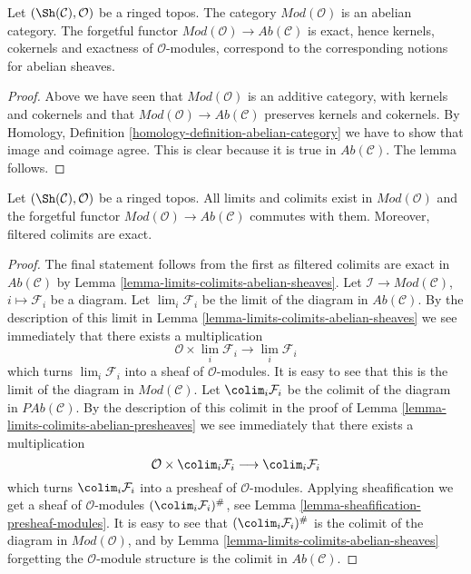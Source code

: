 \begin{lemma}
\label{lemma-abelian}
Let $(\Sh(\mathcal{C}), \mathcal{O})$ be a ringed topos.
The category $\textit{Mod}(\mathcal{O})$ is an abelian category.
The forgetful functor
$\textit{Mod}(\mathcal{O}) \to \textit{Ab}(\mathcal{C})$
is exact, hence kernels, cokernels and exactness of
$\mathcal{O}$-modules, correspond to the corresponding notions
for abelian sheaves.
\end{lemma}

\begin{proof}
Above we have seen that $\textit{Mod}(\mathcal{O})$ is an additive
category, with kernels and cokernels
and that $\textit{Mod}(\mathcal{O}) \to \textit{Ab}(\mathcal{C})$
preserves kernels and cokernels.
By Homology, Definition \ref{homology-definition-abelian-category}
we have to show that image and coimage agree. This is clear
because it is true in $\textit{Ab}(\mathcal{C})$. The lemma follows.
\end{proof}

\begin{lemma}
\label{lemma-limits-colimits}
Let $(\Sh(\mathcal{C}), \mathcal{O})$ be a ringed topos.
All limits and colimits exist in $\textit{Mod}(\mathcal{O})$
and the forgetful functor
$\textit{Mod}(\mathcal{O}) \to \textit{Ab}(\mathcal{C})$
commutes with them. Moreover, filtered colimits are exact.
\end{lemma}

\begin{proof}
The final statement follows from the first as filtered colimits are
exact in $\textit{Ab}(\mathcal{C})$ by
Lemma \ref{lemma-limits-colimits-abelian-sheaves}.
Let $\mathcal{I} \to \textit{Mod}(\mathcal{C})$, $i \mapsto \mathcal{F}_i$
be a diagram. Let $\lim_i \mathcal{F}_i$ be the limit of the diagram
in $\textit{Ab}(\mathcal{C})$. By the description of this limit in
Lemma \ref{lemma-limits-colimits-abelian-sheaves} we see immediately that
there exists a multiplication
$$
\mathcal{O} \times \lim_i \mathcal{F}_i
\longrightarrow
\lim_i \mathcal{F}_i
$$
which turns $\lim_i \mathcal{F}_i$ into a sheaf of
$\mathcal{O}$-modules. It is easy to see that this is the
limit of the diagram in $\textit{Mod}(\mathcal{C})$. Let
$\colim_i \mathcal{F}_i$ be the colimit of the diagram
in $\textit{PAb}(\mathcal{C})$. By the description of this colimit
in the proof of Lemma \ref{lemma-limits-colimits-abelian-presheaves}
we see immediately that there exists a multiplication
$$
\mathcal{O} \times \colim_i \mathcal{F}_i
\longrightarrow
\colim_i \mathcal{F}_i
$$
which turns $\colim_i \mathcal{F}_i$ into a presheaf of
$\mathcal{O}$-modules. Applying sheafification we get a
sheaf of $\mathcal{O}$-modules $(\colim_i \mathcal{F}_i)^\#$,
see Lemma \ref{lemma-sheafification-presheaf-modules}.
It is easy to see that $(\colim_i \mathcal{F}_i)^\#$
is the colimit of the diagram in $\textit{Mod}(\mathcal{O})$, and
by Lemma \ref{lemma-limits-colimits-abelian-sheaves}
forgetting the $\mathcal{O}$-module structure is
the colimit in $\textit{Ab}(\mathcal{C})$.
\end{proof}

